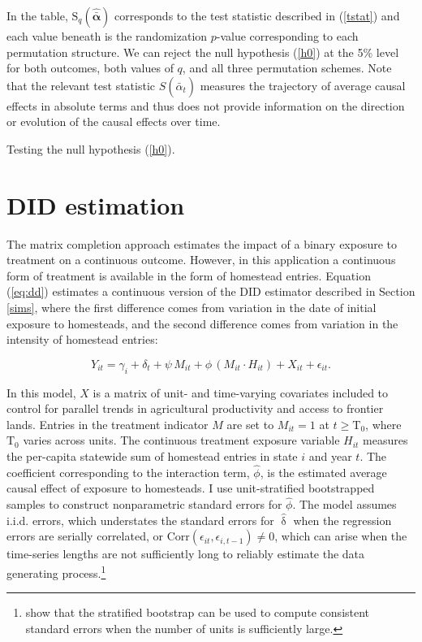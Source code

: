 In the table, $\text{S}_q (\boldsymbol{\hat{\bar{\alpha}}})$ corresponds to the test statistic described in (\ref{tstat}) and each value beneath is the randomization $p$-value corresponding to each permutation structure. We can reject the null hypothesis (\ref{h0}) at the 5\% level for both outcomes, both values of $q$, and all three permutation schemes. Note that the relevant test statistic $S (\hat{\bar{\alpha}}_{t})$ measures the trajectory of average causal effects in absolute terms and thus does not provide information on the direction or evolution of the causal effects over time.

\begin{table}[htbp]
	\captionsetup{font=normalsize}
	\caption{Testing the null hypothesis (\ref{h0}).\label{mc-estimates}}
	\begin{center}
		
	\end{center}
\end{table}

\section{DID estimation} \label{DID}

The matrix completion approach estimates the impact of a binary exposure to treatment on a continuous outcome. However, in this application a continuous form of treatment is available in the form of homestead entries. Equation (\ref{eq:dd}) estimates a continuous version of the DID estimator described in Section \ref{sims}, where the first difference comes from variation in the date of initial exposure to homesteads, and the second difference comes from variation in the intensity of homestead entries:

\begin{equation} 
Y_{it} =  \gamma_i + \delta_t + \psi \, M_{it} + \phi \, (M_{it} \cdot H_{it}) + X_{it}  + \epsilon_{it}. \label{eq:dd} 
\end{equation}

In this model, $X$ is a matrix of unit- and time-varying covariates included to control for parallel trends in agricultural productivity and access to frontier lands. Entries in the treatment indicator $M$ are set to $M_{it} = 1$ at $t \geq  \text{T}_0$, where $\text{T}_0$ varies across units. The continuous treatment exposure variable $H_{it}$ measures the per-capita statewide sum of homestead entries in state $i$ and year $t$. The coefficient corresponding to the interaction term, $\hat{\phi}$, is the estimated average causal effect of exposure to homesteads. I use unit-stratified bootstrapped samples to construct nonparametric standard errors for $\hat{\phi}$. The model assumes i.i.d. errors, which understates the standard errors for $\hat{\updelta}$ when the regression errors are serially correlated, or $\mathrm{Corr} (\epsilon_{it}, \epsilon_{i,t-1}) \neq 0$, which can arise when the time-series lengths are not sufficiently long to reliably estimate the data generating process.\footnote{\citet{bertrand2004much} show that the stratified bootstrap can be used to compute consistent standard errors when the number of units is sufficiently large.}

